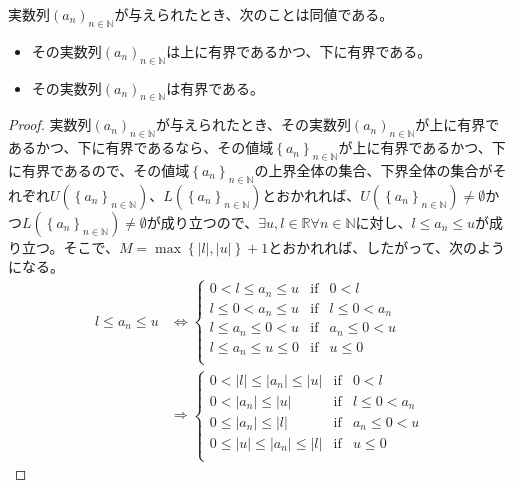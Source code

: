 \documentclass[dvipdfmx]{jsarticle}
\begin{document}
\begin{thm}\label{4.1.4.15}
実数列$\left( a_{n} \right)_{n \in \mathbb{N}}$が与えられたとき、次のことは同値である。
\begin{itemize}
\item
  その実数列$\left( a_{n} \right)_{n \in \mathbb{N}}$は上に有界であるかつ、下に有界である。
\item
  その実数列$\left( a_{n} \right)_{n \in \mathbb{N}}$は有界である。
\end{itemize}
\end{thm}
\begin{proof}
実数列$\left( a_{n} \right)_{n \in \mathbb{N}}$が与えられたとき、その実数列$\left( a_{n} \right)_{n \in \mathbb{N}}$が上に有界であるかつ、下に有界であるなら、その値域$\left\{ a_{n} \right\}_{n \in \mathbb{N}}$が上に有界であるかつ、下に有界であるので、その値域$\left\{ a_{n} \right\}_{n \in \mathbb{N}}$の上界全体の集合、下界全体の集合がそれぞれ$U\left( \left\{ a_{n} \right\}_{n \in \mathbb{N}} \right)$、$L\left( \left\{ a_{n} \right\}_{n \in \mathbb{N}} \right)$とおかれれば、$U\left( \left\{ a_{n} \right\}_{n \in \mathbb{N}} \right) \neq \emptyset$かつ$L\left( \left\{ a_{n} \right\}_{n \in \mathbb{N}} \right) \neq \emptyset$が成り立つので、$\exists u,l \in \mathbb{R}\forall n \in \mathbb{N}$に対し、$l \leq a_{n} \leq u$が成り立つ。そこで、$M = \max\left\{ |l|,|u| \right\} + 1$とおかれれば、したがって、次のようになる。
\begin{align*}
l \leq a_{n} \leq u &\Leftrightarrow \left\{ \begin{matrix}
0 < l \leq a_{n} \leq u & \mathrm{if} & 0 < l \\
l \leq 0 < a_{n} \leq u & \mathrm{if} & l \leq 0 < a_{n} \\
l \leq a_{n} \leq 0 < u & \mathrm{if} & a_{n} \leq 0 < u \\
l \leq a_{n} \leq u \leq 0 & \mathrm{if} & u \leq 0 \\
\end{matrix} \right.\ \\
&\Rightarrow \left\{ \begin{matrix}
0 < |l| \leq \left| a_{n} \right| \leq |u| & \mathrm{if} & 0 < l \\
0 < \left| a_{n} \right| \leq |u| & \mathrm{if} & l \leq 0 < a_{n} \\
0 \leq \left| a_{n} \right| \leq |l| & \mathrm{if} & a_{n} \leq 0 < u \\
0 \leq |u| \leq \left| a_{n} \right| \leq |l| & \mathrm{if} & u \leq 0 \\

\end{matrix}
\end{align*}
\end{proof}
\end{document}
